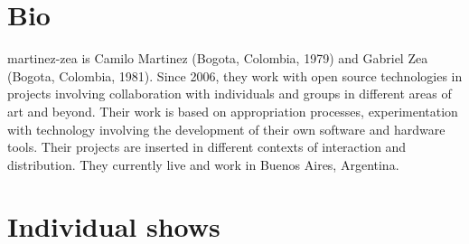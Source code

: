 \documentclass[10pt,letter]{moderncv}
\begin{document}
\maketitle

\section{Bio}
{}{martinez-zea is Camilo Martinez (Bogota, Colombia, 1979) and Gabriel Zea (Bogota, Colombia, 1981). Since 2006, they work with open source technologies in projects involving collaboration with individuals and groups in different areas of art and beyond. Their work is based on appropriation processes, experimentation with technology involving the development of their own software and hardware tools. Their projects are inserted in different contexts of interaction and distribution. They currently live and work in Buenos Aires, Argentina.}{}{}{}{}


\section{Individual shows}

\end{document}
